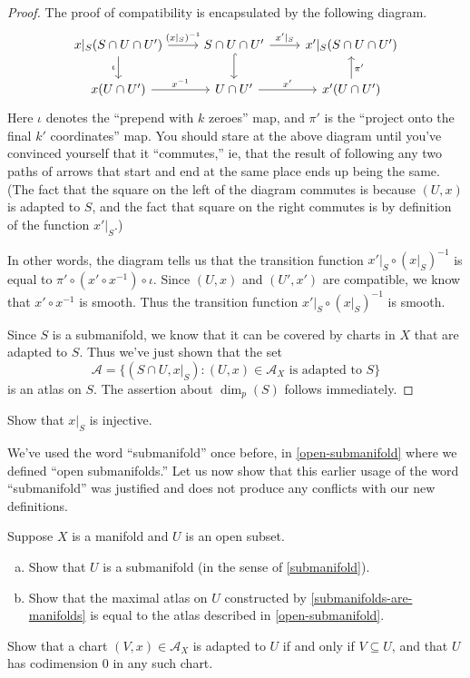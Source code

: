 \begin{proof}
	The proof of compatibility is encapsulated by the following diagram. 
	\[ \begin{tikzcd}
	x|_S(S \cap U \cap U') \ar{r}{(x|_S)^{-1}} \ar{d}[swap]{\iota} & S \cap U \cap U' \ar[hookrightarrow]{d} \ar{r}{x'|_S} & x'|_S(S \cap U \cap U') \\
	x(U \cap U') \ar{r}{x^{-1}} & U \cap U' \ar{r}{x'} & x'(U \cap U') \ar{u}[swap]{\pi'}
	\end{tikzcd} \]
	Here $\iota$ denotes the ``prepend with $k$ zeroes'' map, and $\pi'$ is the ``project onto the final $k'$ coordinates'' map. You should stare at the above diagram until you've convinced yourself that it ``commutes,'' ie, that the result of following any two paths of arrows that start and end at the same place ends up being the same. (The fact that the square on the left of the diagram commutes is because $(U, x)$ is adapted to $S$, and the fact that square on the right commutes is by definition of the function $x'|_S$.)
	
	In other words, the diagram tells us that the transition function $x'|_S \circ (x|_S)^{-1}$ is equal to $\pi' \circ (x' \circ x^{-1}) \circ \iota$. Since $(U,x)$ and $(U', x')$ are compatible, we know that $x' \circ x^{-1}$ is smooth. Thus the transition function $x'|_S \circ (x|_S)^{-1}$ is smooth. 
	
	Since $S$ is a submanifold, we know that it can be covered by charts in $X$ that are adapted to $S$. Thus we've just shown that the set
	\[ \mathscr{A} = \{ (S \cap U, x|_S) : (U, x) \in \mathscr{A}_X \text{ is adapted to } S \} \]
	is an atlas on $S$. The assertion about $\dim_p(S)$ follows immediately. 
\end{proof}

\begin{exercise} \label{submanifolds-are-manifolds-details}
	Show that $x|_S$ is injective. 
\end{exercise}

We've used the word ``submanifold'' once before, in \cref{open-submanifold} where we defined ``open submanifolds.'' Let us now show that this earlier usage of the word ``submanifold'' was justified and does not produce any conflicts with our new definitions.  

\begin{exercise} \label{open-submanifolds-are-submanifolds}
	Suppose $X$ is a manifold and $U$ is an open subset. 
	\begin{enumerate}[(a)]
		\item Show that $U$ is a submanifold (in the sense of \cref{submanifold}). 
		\item Show that the maximal atlas on $U$ constructed by \cref{submanifolds-are-manifolds} is equal to the atlas described in \cref{open-submanifold}. 
	\end{enumerate}
	\begin{hint}
		Show that a chart $(V, x) \in \mathscr{A}_X$ is adapted to $U$ if and only if $V \subseteq U$, and that $U$ has codimension 0 in any such chart. 
	\end{hint}
\end{exercise}

